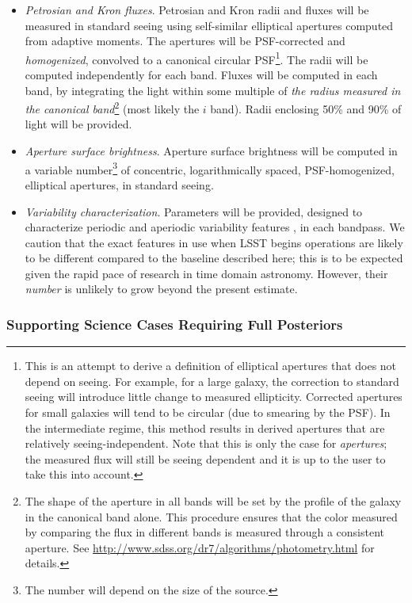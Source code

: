 \begin{itemize}
    \item \emph{Petrosian and Kron fluxes}. Petrosian and Kron radii and fluxes will be measured in standard seeing using self-similar elliptical apertures computed from adaptive moments. The apertures will be PSF-corrected and \emph{homogenized}, convolved to a canonical circular PSF\footnote{This is an attempt to derive a definition of elliptical apertures that does not depend on seeing. For example, for a large galaxy, the correction to standard seeing will introduce little change to measured ellipticity. Corrected apertures for small galaxies will tend to be circular (due to smearing by the PSF). In the intermediate regime, this method results in derived apertures that are relatively seeing-independent. Note that this is only the case for \emph{apertures}; the measured flux will still be seeing dependent and it is up to the user to take this into account.}. The radii will be computed independently for each band. Fluxes will be computed in each band, by integrating the light within some multiple of \emph{the radius measured in the canonical band}\footnote{The shape of the aperture in all bands will be set by the profile of the galaxy in the canonical band alone. This procedure ensures that the color measured by comparing the flux in different bands is measured through a consistent aperture. See \url{http://www.sdss.org/dr7/algorithms/photometry.html} for details.} (most likely the $i$ band). Radii enclosing 50\% and 90\% of light will be provided. 

    \item \emph{Aperture surface brightness}. Aperture surface brightness will be computed in a variable number\footnote{The number will depend on the size of the source.} of concentric, logarithmically spaced, PSF-homogenized, elliptical apertures, in standard seeing. 

    \item \emph{Variability characterization}. Parameters will be provided, designed to characterize periodic and aperiodic variability features \citep{2011ApJ...733...10R}, in each bandpass.
    We caution that the exact features in use when LSST begins operations are likely to be different compared to the baseline described here; this is to be expected given the rapid pace of research in time domain astronomy. However, their \emph{number} is unlikely to grow beyond the present estimate. 
\end{itemize}

\subsubsection{Supporting Science Cases Requiring Full Posteriors}

